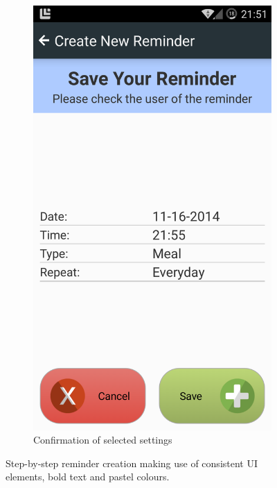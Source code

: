 \begin{figure}[h]
\begin{subfigure}[t]{0.3\textwidth}
        \includegraphics[width=\textwidth]{Files/treatment-study-1/figures/app-remindercreate-confirmation}
        \caption{Confirmation of selected settings}
        \label{fig: remindercreate-confirmation}
    \end{subfigure}
    \caption{Step-by-step reminder creation making use of consistent UI elements, bold text and pastel colours.}
    \label{fig: taut-remindercreation}
\end{figure}

